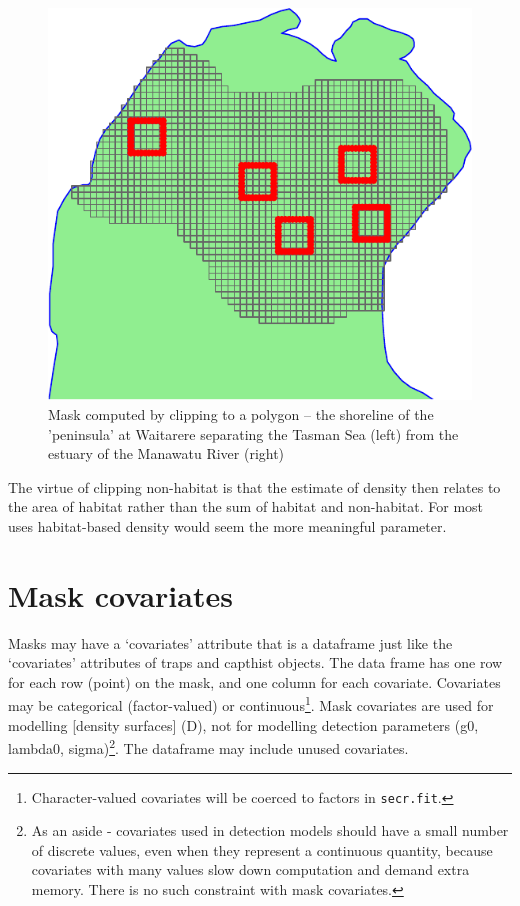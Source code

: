 \documentclass[
]{book}
\begin{document}
\begin{figure}

{\centering \includegraphics{SECRbook_files/figure-latex/plotpossummask-1} 

}

\caption{Mask computed by clipping to a polygon -- the shoreline of the 'peninsula' at Waitarere separating the Tasman Sea (left) from the estuary of the Manawatu River (right)}\label{fig:plotpossummask}
\end{figure}

The virtue of clipping non-habitat is that the estimate of density then relates to the area of habitat rather than the sum of habitat and non-habitat. For most uses habitat-based density would seem the more meaningful parameter.

\section{Mask covariates}\label{mask-covariates}

Masks may have a `covariates' attribute that is a dataframe just like the `covariates' attributes of traps and capthist objects. The data frame has one row for each row (point) on the mask, and one column for each covariate. Covariates may be categorical (factor-valued) or continuous\footnote{Character-valued covariates will be coerced to factors in \texttt{secr.fit}.}. Mask covariates are used for modelling {[}density surfaces{]} (D), not for modelling detection parameters (g0, lambda0, sigma)\footnote{As an aside - covariates used in detection models should have a small number of discrete values, even when they represent a continuous quantity, because covariates with many values slow down computation and demand extra memory. There is no such constraint with mask covariates.}. The dataframe may include unused covariates.
\end{document}
